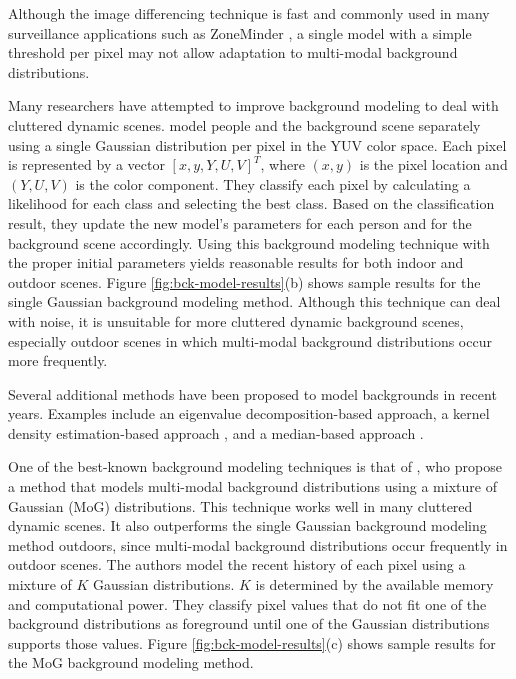 Although the image differencing technique is fast and commonly used in
many surveillance applications such as
ZoneMinder , a single model with a simple
threshold per pixel may not allow adaptation to multi-modal background
distributions.

Many researchers have attempted to improve background modeling to deal
with cluttered dynamic scenes.  model people
and the background scene separately using a single Gaussian
distribution per pixel in the YUV color space. Each pixel is
represented by a vector $[x, y, Y, U, V]^T$, where $(x, y)$ is the
pixel location and $(Y, U, V)$ is the color component. They classify
each pixel by calculating a likelihood for each class and selecting
the best class.  Based on the classification result, they update the new
model's parameters for each person and for the background scene
accordingly.  Using this background modeling technique with the proper
initial parameters yields reasonable results for both indoor and
outdoor scenes. Figure \ref{fig:bck-model-results}(b) shows sample results
for the single Gaussian background modeling method. Although this
technique can deal with noise, it is unsuitable for more cluttered
dynamic background scenes, especially outdoor scenes in which
multi-modal background distributions occur more frequently.

Several additional methods have been proposed to model backgrounds in
recent years. Examples include an eigenvalue decomposition-based
approach, a kernel density
estimation-based approach , and a
median-based approach .

One of the best-known background modeling techniques is that
of , who propose a method that models
multi-modal background distributions using a mixture of Gaussian (MoG)
distributions. This technique works well in many cluttered dynamic
scenes. It also outperforms the single Gaussian background modeling
method outdoors, since multi-modal background distributions occur
frequently in outdoor scenes. The authors model the recent history of
each pixel using a mixture of $K$ Gaussian distributions. $K$ is
determined by the available memory and computational power. They
classify pixel values that do not fit one of the background
distributions as foreground until one of the Gaussian distributions
supports those values. Figure \ref{fig:bck-model-results}(c) shows sample
results for the MoG background modeling method.

